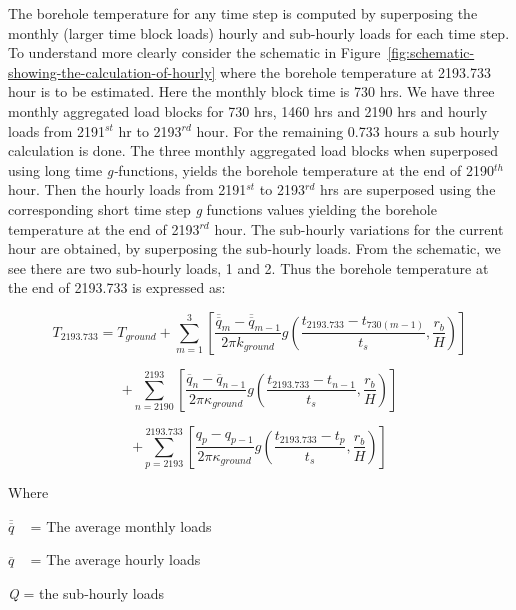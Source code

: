 The borehole temperature for any time step is computed by superposing the monthly (larger time block loads) hourly and sub-hourly loads for each time step. To understand more clearly consider the schematic in Figure~\ref{fig:schematic-showing-the-calculation-of-hourly} where the borehole temperature at 2193.733 hour is to be estimated. Here the monthly block time is 730 hrs. We have three monthly aggregated load blocks for 730 hrs, 1460 hrs and 2190 hrs and hourly loads from 2191\(^{st}\) hr to 2193\(^{rd}\) hour. For the remaining 0.733 hours a sub hourly calculation is done. The three monthly aggregated load blocks when superposed using long time \emph{g-}functions, yields the borehole temperature at the end of 2190\(^{th}\) hour. Then the hourly loads from 2191\(^{st}\) to 2193\(^{rd}\) hrs are superposed using the corresponding short time step \emph{g} functions values yielding the borehole temperature at the end of 2193\(^{rd}\) hour. The sub-hourly variations for the current hour are obtained, by superposing the sub-hourly loads. From the schematic, we see there are two sub-hourly loads, 1 and 2. Thus the borehole temperature at the end of 2193.733 is expressed as:

\begin{equation}
{T_{2193.733}} = {T_{ground}} + \sum\limits_{m = 1}^3 {\left[ {\frac{{{{\overline{\overline q} }_m} - {{\overline{\overline q} }_{m - 1}}}}{{2\pi {k_{ground}}}}g\left( {\frac{{{t_{2193.733}} - {t_{730(m - 1)}}}}{{{t_s}}},\frac{{{r_b}}}{H}} \right)} \right]}
\end{equation}

\begin{equation}
+ \sum\limits_{n = 2190}^{2193} {\left[ {\frac{{{{\overline q }_n} - {{\overline q }_{n - 1}}}}{{2\pi {\kappa_{ground}}}}g\left( {\frac{{{t_{2193.733}} - {t_{n - 1}}}}{{{t_s}}},\frac{{{r_b}}}{H}} \right)} \right]}
\end{equation}

\begin{equation}
+ \sum\limits_{p = 2193}^{2193.733} {\left[ {\frac{{{q_p} - {q_{p - 1}}}}{{2\pi {\kappa_{ground}}}}g\left( {\frac{{{t_{2193.733}} - {t_p}}}{{{t_s}}},\frac{{{r_b}}}{H}} \right)} \right]}
\end{equation}

Where

\(\overline{\overline q}\) ~ = The average monthly loads

\(\overline q\) ~ = The average hourly loads

\emph{Q} = the sub-hourly loads


